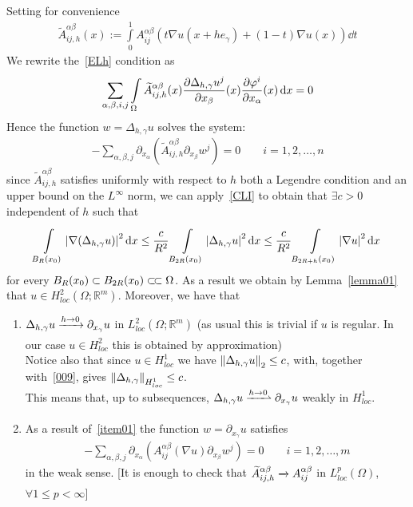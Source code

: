 Setting for convenience
\begin{gather}
	\widetilde{A}_{ij,h}^{\alpha \beta }(x):=  \int\limits_{0}^{1} A_{ij}^{\alpha \beta } \left( t\nabla u(x+h e_{\gamma }) +(1-t) \nabla u(x) \right) \dd{t}
\end{gather}
We rewrite the~\eqref{ELh} condition as
\begin{gather}
	\sum\limits_{\alpha, \beta , i,j}^{} \int\limits_{\Omega}^{} \widetilde{A}_{ij,h}^{\alpha \beta }(x) \pdv[]{\Delta _{h, \gamma } u^{j}}{x_{\beta }}(x) \pdv[]{\varphi ^{i}}{x_{\alpha }}(x)   \mathop{}\!\mathrm{d}x = 0
\end{gather}
Hence the function \( w = \Delta _{h, \gamma } u \) solves the system:
\begin{gather}
	- \sum\limits_{\alpha, \beta , j}^{} \partial_{x_{\alpha }} \left( \widetilde{A}_{ij,h}^{\alpha \beta } \partial_{x_{\beta }}w^{j} \right) = 0\qquad i=1,2,\ldots,n
\end{gather}
since \( \widetilde{A}_{ij,h}^{\alpha \beta } \) satisfies uniformly with respect to \( h \) both a Legendre condition and an upper bound on the \( L^{\infty } \) norm, we can apply~\eqref{CLI} to obtain that \( \exists c>0 \) independent of \( h \) such that
\begin{gather}
	\int\limits_{B_{R}(x_{0})}^{} \abs{\nabla (\Delta _{h, \gamma }u) }^{2} \dd{x} \leq  \frac{c}{R^{2}} \int\limits_{B_{2R}(x_{0})}^{} \abs{\Delta _{h, \gamma }u}^{2} \dd{x} \leq  \frac{c}{R^{2}} \int\limits_{B_{2R+h}(x_{0}) }^{} \abs{\nabla u}^{2} \dd{x} \label{009}
\end{gather}
for every \( B_{R}(x_{0}) \subset B_{2R}(x_{0}) \ssubset \Omega  \). As a result we obtain by Lemma~\ref{lemma01} that \( u \in H_{loc}^{2}(\Omega ; \mathbb{R}^{m})  \). Moreover, we have that
\begin{enumerate}[label= (\roman*)]
	\item\label{item01} \( \Delta _{h, \gamma } u \myxrightarrow[]{h \to 0} \partial_{x_{\gamma }}u \) in \( L_{loc}^{2}(\Omega ; \mathbb{R}^{m})  \) (as usual this is trivial if \( u \) is regular. In our case \( u \in  H_{loc}^{2} \) this is obtained by approximation) \\
	Notice also that since \( u \in H_{loc}^{1} \) we have \( \left\lVert\Delta _{h, \gamma }u\right\rVert_{2} \leq c \), with, together with~\eqref{009}, gives \( \left\lVert\Delta _{h, \gamma }\right\rVert_{H_{loc}^{1}}\leq c \). \\
	This means that, up to subsequences, \( \Delta _{h, \gamma }u \myxrightharpoonup[]{h \to 0} \partial_{x_{\gamma }}u \) weakly in \( H_{loc}^{1} \).
	\item As a result of~\ref{item01} the function \( w = \partial_{x_{\gamma }}u \) satisfies
	      \begin{gather}
		      - \sum\limits_{\alpha ,\beta ,j}^{} \partial_{x_{\alpha }} \left( A_{ij}^{\alpha \beta }(\nabla u) \partial_{x_{\beta }} w^{j} \right) = 0 \qquad i=1,2,\ldots,m
	      \end{gather}
	      in the weak sense. [It is enough to check that \( \widetilde{A}_{ij,h}^{\alpha \beta } \myxrightarrow[]{} A_{ij}^{\alpha \beta }\) in \( L_{loc}^{p}(\Omega ) \), \( \forall 1 \leq p < \infty \)]
\end{enumerate}

